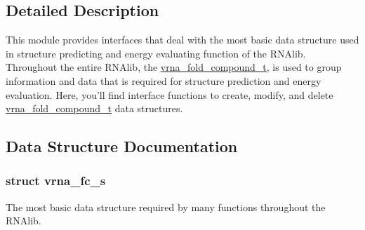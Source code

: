 

\subsection{Detailed Description}
This module provides interfaces that deal with the most basic data structure used in structure predicting and energy evaluating function of the R\-N\-Alib. Throughout the entire R\-N\-Alib, the \hyperlink{group__fold__compound_ga1b0cef17fd40466cef5968eaeeff6166}{vrna\-\_\-fold\-\_\-compound\-\_\-t}, is used to group information and data that is required for structure prediction and energy evaluation. Here, you'll find interface functions to create, modify, and delete \hyperlink{group__fold__compound_ga1b0cef17fd40466cef5968eaeeff6166}{vrna\-\_\-fold\-\_\-compound\-\_\-t} data structures. 

\subsection{Data Structure Documentation}
\label{structvrna__fc__s}
\hypertarget{group__fold__compound_structvrna__fc__s}{}
\subsubsection{struct vrna\-\_\-fc\-\_\-s}
The most basic data structure required by many functions throughout the R\-N\-Alib. 

